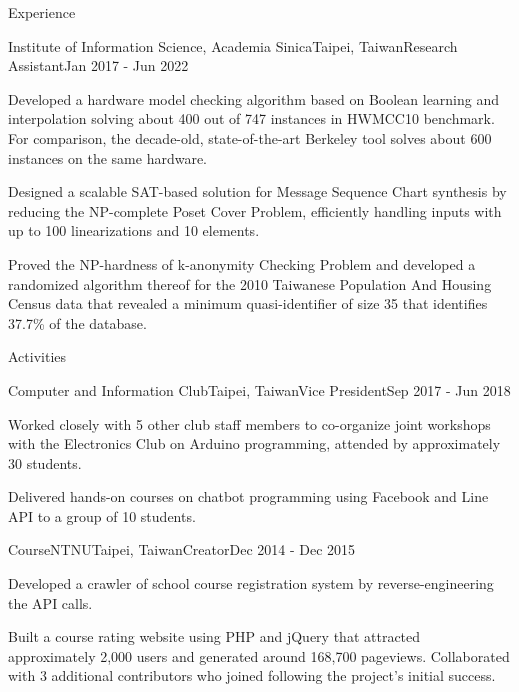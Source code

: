 \documentclass{resume} %
\begin{document}
\begin{rSection}{Experience}
\begin{rSubsection}{Institute of Information Science, Academia Sinica}{Taipei, Taiwan}{Research Assistant}{Jan 2017 - Jun 2022}
\item Developed a hardware model checking algorithm based on Boolean learning and interpolation solving about 400 out of 747 instances in HWMCC10 benchmark. For comparison, the decade-old, state-of-the-art Berkeley tool solves about 600 instances on the same hardware.
\item Designed a scalable SAT-based solution for Message Sequence Chart synthesis by reducing the NP-complete Poset Cover Problem, efficiently handling inputs with up to 100 linearizations and 10 elements.
\item Proved the NP-hardness of k-anonymity Checking Problem and developed a randomized algorithm thereof for the 2010 Taiwanese Population And Housing Census data that revealed a minimum quasi-identifier of size 35 that identifies 37.7\% of the database.
\end{rSubsection}

\end{rSection}

\begin{rSection}{Activities}

\begin{rSubsection}{Computer and Information Club}{Taipei, Taiwan}{Vice President}{Sep 2017 - Jun 2018}
\item Worked closely with 5 other club staff members to co-organize joint workshops with the Electronics Club on Arduino programming, attended by approximately 30 students.
\item Delivered hands-on courses on chatbot programming using Facebook and Line API to a group of 10 students.
\end{rSubsection}

\begin{rSubsection}{CourseNTNU}{Taipei, Taiwan}{Creator}{Dec 2014 - Dec 2015}
\item Developed a crawler of school course registration system by reverse-engineering the API calls.
\item Built a course rating website using PHP and jQuery that attracted approximately 2,000 users and generated around     168,700 pageviews. Collaborated with 3 additional contributors who joined following the project's initial success.
\end{rSubsection}

\end{rSection}
\end{document}
